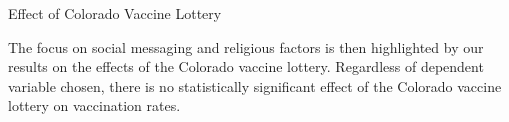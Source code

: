 \documentclass[12pt]{article}
\begin{document}
\begin{spacing}{1.5}
		\begin{table}
			\centering
			\caption{Effect of Colorado Vaccine Lottery}
			\centerline{}
			\label{table:didresults}
		\end{table}
		
		The focus on social messaging and religious factors is then highlighted by our results on the effects of the Colorado vaccine lottery. Regardless of dependent variable chosen, there is no statistically significant effect of the Colorado vaccine lottery on vaccination rates.
		
		
	
		
	\end{spacing}
\end{document}
